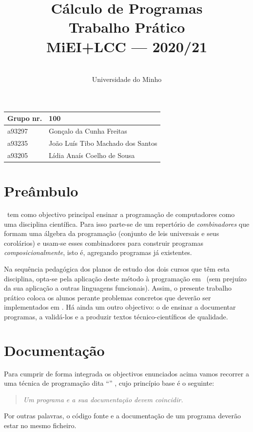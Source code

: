 \documentclass[a4paper]{article}
\title{
       	Cálculo de Programas
\\
       	Trabalho Prático
\\
       	MiEI+LCC --- 2020/21
}
\author{
       	\dium
\\
       	Universidade do Minho
}
\date\mydate
\begin{document}
\maketitle

\begin{center}\large
\begin{tabular}{ll}
\textbf{Grupo} nr. & 100
\\\hline
a93297 & Gonçalo da Cunha Freitas	
\\
a93235 & João Luís Tibo Machado dos Santos	
\\
a93205 & Lídia Anaís Coelho de Sousa	
\\
\end{tabular}
\end{center}

\section{Preâmbulo}

\CP\ tem como objectivo principal ensinar
a progra\-mação de computadores como uma disciplina científica. Para isso
parte-se de um repertório de \emph{combinadores} que formam uma álgebra da
programação (conjunto de leis universais e seus corolários) e usam-se esses
combinadores para construir programas \emph{composicionalmente}, isto é,
agregando programas já existentes.
  
Na sequência pedagógica dos planos de estudo dos dois cursos que têm
esta disciplina, opta-se pela aplicação deste método à programação
em \Haskell\ (sem prejuízo da sua aplicação a outras linguagens 
funcionais). Assim, o presente trabalho prático coloca os
alunos perante problemas concretos que deverão ser implementados em
\Haskell.  Há ainda um outro objectivo: o de ensinar a documentar
programas, a validá-los e a produzir textos técnico-científicos de
qualidade.

\section{Documentação} Para cumprir de forma integrada os objectivos
enunciados acima vamos recorrer a uma técnica de programa\-ção dita
``'' \cite{Kn92}, cujo princípio base é o seguinte:
%
\begin{quote}\em Um programa e a sua documentação devem coincidir.
\end{quote}
%
Por outras palavras, o código fonte e a documentação de um
programa deverão estar no mesmo ficheiro.
\end{document}
